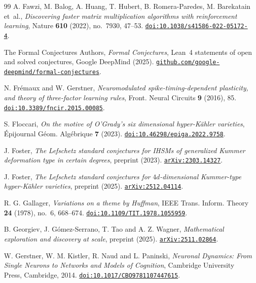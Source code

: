 \begin{thebibliography}{99}
A. Fawzi, M. Balog, A. Huang, T. Hubert, B. Romera-Paredes, M. Barekatain et~al.,
\emph{Discovering faster matrix multiplication algorithms with reinforcement learning},
Nature \textbf{610} (2022), no.~7930, 47--53.
\href{https://doi.org/10.1038/s41586-022-05172-4}{\nolinkurl{doi:10.1038/s41586-022-05172-4}}.

The Formal Conjectures Authors,
\emph{Formal Conjectures}, Lean~4 statements of open and solved conjectures, Google DeepMind (2025).
\href{https://github.com/google-deepmind/formal-conjectures}{\nolinkurl{github.com/google-deepmind/formal-conjectures}}.

N. Fr\'emaux and W. Gerstner,
\emph{Neuromodulated spike-timing-dependent plasticity, and theory of three-factor learning rules},
Front. Neural Circuits \textbf{9} (2016), 85.
\href{https://doi.org/10.3389/fncir.2015.00085}{\nolinkurl{doi:10.3389/fncir.2015.00085}}.

S. Floccari,
\emph{On the motive of O'Grady's six dimensional hyper-K\"ahler varieties},
\'Epijournal G\'eom. Alg\'ebrique \textbf{7} (2023).
\href{https://doi.org/10.46298/epiga.2022.9758}{\nolinkurl{doi:10.46298/epiga.2022.9758}}.

J. Foster,
\emph{The Lefschetz standard conjectures for IHSMs of generalized Kummer deformation type in certain degrees},
preprint (2023).
\href{https://arxiv.org/abs/2303.14327}{\nolinkurl{arXiv:2303.14327}}.

J. Foster,
\emph{The Lefschetz standard conjectures for $4d$-dimensional Kummer-type hyper-K\"ahler varieties},
preprint (2025).
\href{https://arxiv.org/abs/2512.04114}{\nolinkurl{arXiv:2512.04114}}.

R. G. Gallager,
\emph{Variations on a theme by Huffman},
IEEE Trans. Inform. Theory \textbf{24} (1978), no.~6, 668--674.
\href{https://doi.org/10.1109/TIT.1978.1055959}{\nolinkurl{doi:10.1109/TIT.1978.1055959}}.

B. Georgiev, J. G\'omez-Serrano, T. Tao and A. Z. Wagner,
\emph{Mathematical exploration and discovery at scale},
preprint (2025).
\href{https://arxiv.org/abs/2511.02864}{\nolinkurl{arXiv:2511.02864}}.

W. Gerstner, W. M. Kistler, R. Naud and L. Paninski,
\emph{Neuronal Dynamics: From Single Neurons to Networks and Models of Cognition},
Cambridge University Press, Cambridge, 2014.
\href{https://doi.org/10.1017/CBO9781107447615}{\nolinkurl{doi:10.1017/CBO9781107447615}}.


\end{thebibliography}
